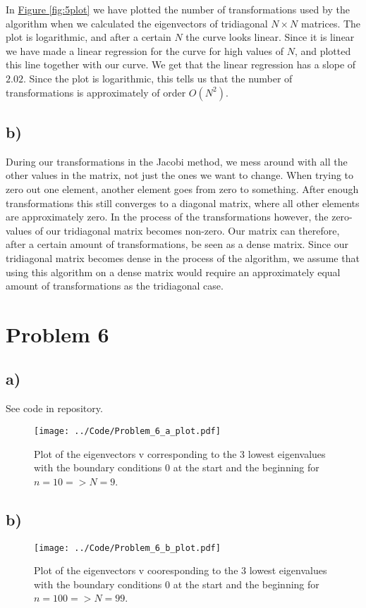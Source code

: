 \documentclass[english,notitlepage]{article}  %
\begin{document}
In \hyperref[fig:5plot]{Figure \ref*{fig:5plot}} we have plotted the number of
transformations used by the algorithm when we calculated the eigenvectors of
tridiagonal $N \times N$ matrices. The plot is logarithmic, and after a certain
$N$ the curve looks linear. Since it is linear we have made a linear regression
for the curve for high values of $N$, and plotted this line together with our
curve. We get that the linear regression has a slope of $2.02$. Since the plot
is logarithmic, this tells us that the number of transformations is
approximately of order $O(N^2)$.


\subsection*{b)}
During our transformations in the Jacobi method, we mess around with all the
other values in the matrix, not just the ones we want to change. When trying to
zero out one element, another element goes from zero to something. After enough
transformations this still converges to a diagonal matrix, where all other
elements are approximately zero. In the process of the transformations however,
the zero-values of our tridiagonal matrix becomes non-zero. Our matrix can
therefore, after a certain amount of transformations, be seen as a dense matrix.
Since our tridiagonal matrix becomes dense in the process of the algorithm, we
assume that using this algorithm on a dense matrix would require an
approximately equal amount of transformations as the tridiagonal case.

\section*{Problem 6}
\subsection*{a)}
See code in repository.

\begin{figure}[H]
    \centering
    \texttt{[image: ../Code/Problem\_6\_a\_plot.pdf]}
    \caption{Plot of the eigenvectors v corresponding to the 3 lowest eigenvalues with the boundary conditions 0 at the start and the beginning for $n=10=>N=9$.}
    \label{fig:6aplot}
\end{figure}

\subsection*{b)}

\begin{figure}[H]
    \centering
    \texttt{[image: ../Code/Problem\_6\_b\_plot.pdf]}
    \caption{Plot of the eigenvectors v cooresponding to the 3 lowest eigenvalues with the boundary conditions 0 at the start and the beginning for $n=100=>N=99$.}
    \label{fig:6bplot}
\end{figure}
\end{document}
